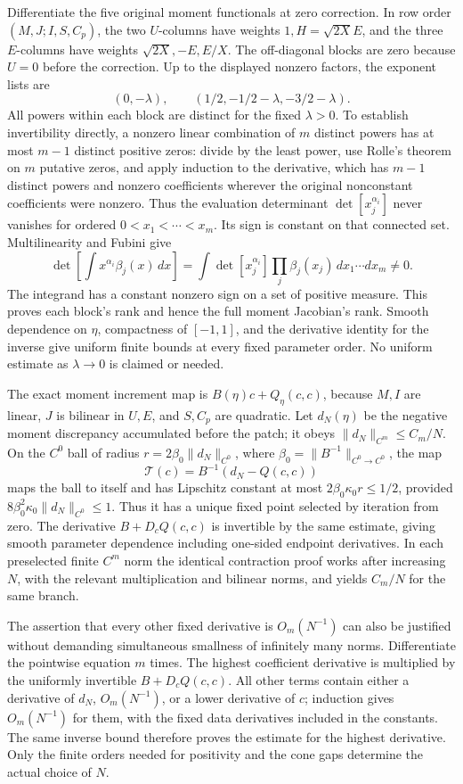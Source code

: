 \documentclass[10pt,a4paper]{article}
\begin{document}
Differentiate the five original moment functionals at zero correction. In row order \((M,J;I,S,C_p)\), the two \(U\)-columns have weights \(1,H=\sqrt{2X}E\), and the three \(E\)-columns have weights \(\sqrt{2X},-E,E/X\). The off-diagonal blocks are zero because \(U=0\) before the correction. Up to the displayed nonzero factors, the exponent lists are \[
(0,-\lambda),\qquad
(1/2,-1/2-\lambda,-3/2-\lambda).
\] All powers within each block are distinct for the fixed \(\lambda>0\). To establish invertibility directly, a nonzero linear combination of \(m\) distinct powers has at most \(m-1\) distinct positive zeros: divide by the least power, use Rolle's theorem on \(m\) putative zeros, and apply induction to the derivative, which has \(m-1\) distinct powers and nonzero coefficients wherever the original nonconstant coefficients were nonzero. Thus the evaluation determinant \(\det[x_j^{\alpha_i}]\) never vanishes for ordered \(0<x_1<\cdots<x_m\). Its sign is constant on that connected set. Multilinearity and Fubini give \[
\det\left[\int x^{\alpha_i}\beta_j(x)\,dx\right]
=\int\det[x_j^{\alpha_i}]\prod_j\beta_j(x_j)\,dx_1\cdots dx_m\ne0.
\] The integrand has a constant nonzero sign on a set of positive measure. This proves each block's rank and hence the full moment Jacobian's rank. Smooth dependence on \(\eta\), compactness of \([-1,1]\), and the derivative identity for the inverse give uniform finite bounds at every fixed parameter order. No uniform estimate as \(\lambda\to0\) is claimed or needed.

The exact moment increment map is \(B(\eta)c+Q_\eta(c,c)\), because \(M,I\) are linear, \(J\) is bilinear in \(U,E\), and \(S,C_p\) are quadratic. Let \(d_N(\eta)\) be the negative moment discrepancy accumulated before the patch; it obeys \(\|d_N\|_{C^m}\le C_m/N\). On the \(C^0\) ball of radius \(r=2\beta_0\|d_N\|_{C^0}\), where \(\beta_0=\|B^{-1}\|_{C^0\to C^0}\), the map \[
\mathcal T(c)=B^{-1}(d_N-Q(c,c))
\] maps the ball to itself and has Lipschitz constant at most \(2\beta_0\kappa_0r\le1/2\), provided \(8\beta_0^2\kappa_0\|d_N\|_{C^0}\le1\). Thus it has a unique fixed point selected by iteration from zero. The derivative \(B+D_cQ(c,c)\) is invertible by the same estimate, giving smooth parameter dependence including one-sided endpoint derivatives. In each preselected finite \(C^m\) norm the identical contraction proof works after increasing \(N\), with the relevant multiplication and bilinear norms, and yields \(C_m/N\) for the same branch.

The assertion that every other fixed derivative is \(O_m(N^{-1})\) can also be justified without demanding simultaneous smallness of infinitely many norms. Differentiate the pointwise equation \(m\) times. The highest coefficient derivative is multiplied by the uniformly invertible \(B+D_cQ(c,c)\). All other terms contain either a derivative of \(d_N\), \(O_m(N^{-1})\), or a lower derivative of \(c\); induction gives \(O_m(N^{-1})\) for them, with the fixed data derivatives included in the constants. The same inverse bound therefore proves the estimate for the highest derivative. Only the finite orders needed for positivity and the cone gaps determine the actual choice of \(N\).
\end{document}
